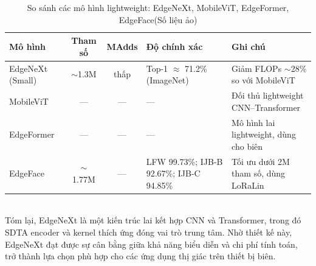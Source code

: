 \begin{table}[ht]
  \caption{So sánh các mô hình lightweight: EdgeNeXt, MobileViT, EdgeFormer, EdgeFace(Số liệu ảo)}
  \label{tab:compare_lightweight}
  \centering
  \begin{tabularx}{\textwidth}{l c c p{3cm} p{3.2cm}}
    \toprule
    \textbf{Mô hình} & \textbf{Tham số} & \textbf{MAdds} & \textbf{Độ chính xác} & \textbf{Ghi chú} \\
    \midrule
    EdgeNeXt (Small) & $\sim$1.3M & thấp & Top-1 $\approx$ 71.2\% (ImageNet) & Giảm FLOPs $\sim$28\% so với MobileViT \\
    MobileViT & — & — & — & Đối thủ lightweight CNN–Transformer \\
    EdgeFormer & — & — & — & Mô hình lai lightweight, dùng cho biên \\
    EdgeFace & $\sim$1.77M & — & LFW 99.73\%; IJB-B 92.67\%; IJB-C 94.85\% & Tối ưu dưới 2M tham số, dùng LoRaLin \\
    \bottomrule
  \end{tabularx}
\end{table} \\



Tóm lại, EdgeNeXt là một kiến trúc lai kết hợp CNN và Transformer, trong đó SDTA encoder và kernel thích ứng đóng vai trò trung tâm. Nhờ thiết kế này, EdgeNeXt đạt được sự cân bằng giữa khả năng biểu diễn và chi phí tính toán, trở thành lựa chọn phù hợp cho các ứng dụng thị giác trên thiết bị biên.







